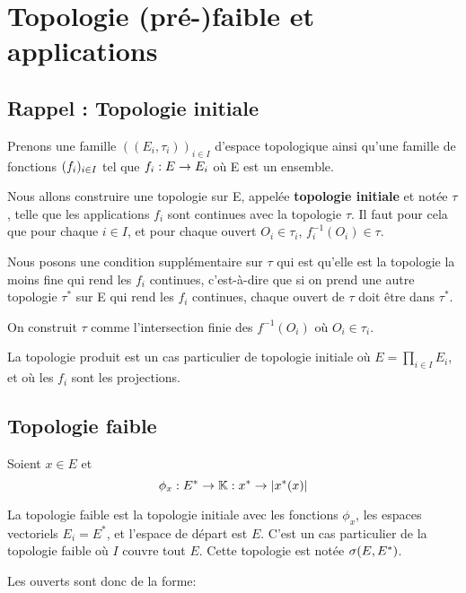\chapter{Topologie (pré-)faible et applications}

\section{Rappel : Topologie initiale}

Prenons une famille
$( (E_{i}, \tau_{i}) )_{i \in I}$ d'espace topologique ainsi qu'une famille de fonctions $(f_{i})_{i \in I}$ tel que
$f_{i} : E \rightarrow E_{i}$ où E est un ensemble.

Nous allons construire une topologie sur E, appelée \textbf{topologie initiale}
et notée $\tau$, telle que les applications $f_{i}$ sont continues avec la
topologie $\tau$. Il faut
pour cela que pour chaque $i \in I$, et pour chaque ouvert $O_{i} \in \tau_{i}$,
$f_{i}^{-1}(O_{i}) \in \tau$.

Nous posons une condition supplémentaire sur $\tau$ qui est qu'elle est la
topologie la moins fine qui rend les $f_{i}$ continues, c'est-à-dire que si on
prend une autre topologie $\tau^{*}$ sur E qui rend les $f_{i}$ continues, chaque
ouvert de $\tau$ doit être dans $\tau^{*}$.

On construit $\tau$ comme l'intersection finie des $f^{-1}(O_{i})$ où $O_{i} \in
\tau_{i}$.

\begin{exemple}
	La topologie produit est un cas particulier de topologie initiale où $E =
	\displaystyle \prod_{i \in I} E_{i}$, et où les $f_{i}$ sont les projections.
\end{exemple}

\section{Topologie faible}

Soient $x \in E$ et
\begin{equation}
	\phi_{x} : E^{*} \rightarrow \mathbb{K} : x^{*} \rightarrow \abs{x^{*}(x)}
\end{equation}

La topologie faible est la topologie initiale avec les fonctions $\phi_{x}$, les
espaces vectoriels $E_{i} = E^{*}$, et l'espace de départ est $E$. C'est un cas
particulier de la topologie faible où $I$ couvre tout $E$. Cette topologie est
notée $\sigma(E, E^{*})$.

Les ouverts sont donc de la forme:

